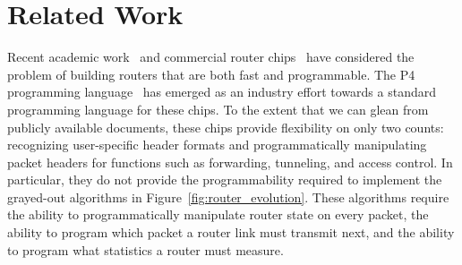 \chapter{Related Work}
\label{chap:related}

Recent academic work~\cite{rmt} and commercial router chips~\cite{tofino,
flexpipe, xpliant} have considered the problem of building routers that are
both fast and programmable. The P4 programming language~\cite{p4} has emerged
as an industry effort towards a standard programming language for these chips.
To the extent that we can glean from publicly available documents, these chips
provide flexibility on only two counts: recognizing user-specific header
formats and programmatically manipulating packet headers for functions such as
forwarding, tunneling, and access control. In particular, they do not provide
the programmability required to implement the grayed-out algorithms in
Figure~\ref{fig:router_evolution}.  These algorithms require the ability to
programmatically manipulate router state on every packet, the ability to
program which packet a router link must transmit next, and the ability to
program what statistics a router must measure.





